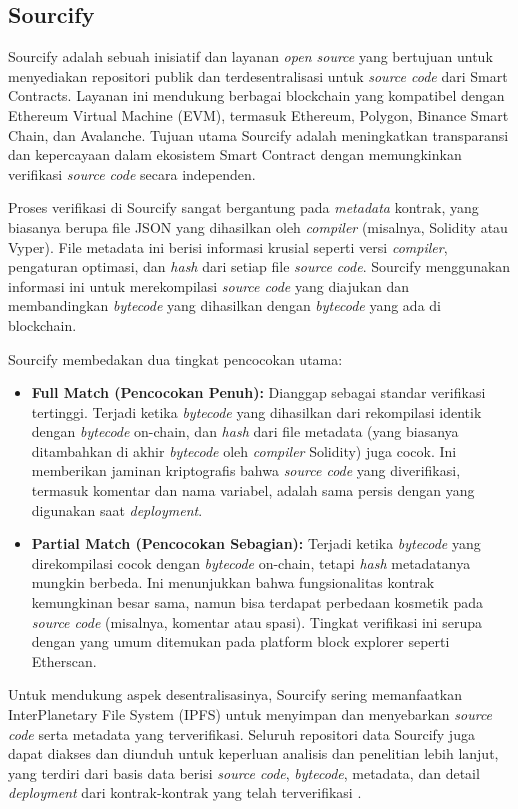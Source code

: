 \subsection{Sourcify}
\label{subsec:sourcify}

Sourcify adalah sebuah inisiatif dan layanan \textit{open source} yang bertujuan untuk menyediakan repositori publik dan terdesentralisasi untuk \textit{source code} dari Smart Contracts. Layanan ini mendukung berbagai blockchain yang kompatibel dengan Ethereum Virtual Machine (EVM), termasuk Ethereum, Polygon, Binance Smart Chain, dan Avalanche. Tujuan utama Sourcify adalah meningkatkan transparansi dan kepercayaan dalam ekosistem Smart Contract dengan memungkinkan verifikasi \textit{source code} secara independen.

Proses verifikasi di Sourcify sangat bergantung pada \textit{metadata} kontrak, yang biasanya berupa file JSON yang dihasilkan oleh \textit{compiler} (misalnya, Solidity atau Vyper). File metadata ini berisi informasi krusial seperti versi \textit{compiler}, pengaturan optimasi, dan \textit{hash} dari setiap file \textit{source code}. Sourcify menggunakan informasi ini untuk merekompilasi \textit{source code} yang diajukan dan membandingkan \textit{bytecode} yang dihasilkan dengan \textit{bytecode} yang ada di blockchain.

Sourcify membedakan dua tingkat pencocokan utama:
\begin{itemize}
	\item \textbf{Full Match (Pencocokan Penuh):} Dianggap sebagai standar verifikasi tertinggi. Terjadi ketika \textit{bytecode} yang dihasilkan dari rekompilasi identik dengan \textit{bytecode} on-chain, dan \textit{hash} dari file metadata (yang biasanya ditambahkan di akhir \textit{bytecode} oleh \textit{compiler} Solidity) juga cocok. Ini memberikan jaminan kriptografis bahwa \textit{source code} yang diverifikasi, termasuk komentar dan nama variabel, adalah sama persis dengan yang digunakan saat \textit{deployment}.
	\item \textbf{Partial Match (Pencocokan Sebagian):} Terjadi ketika \textit{bytecode} yang direkompilasi cocok dengan \textit{bytecode} on-chain, tetapi \textit{hash} metadatanya mungkin berbeda. Ini menunjukkan bahwa fungsionalitas kontrak kemungkinan besar sama, namun bisa terdapat perbedaan kosmetik pada \textit{source code} (misalnya, komentar atau spasi). Tingkat verifikasi ini serupa dengan yang umum ditemukan pada platform block explorer seperti Etherscan.
\end{itemize}

Untuk mendukung aspek desentralisasinya, Sourcify sering memanfaatkan InterPlanetary File System (IPFS) untuk menyimpan dan menyebarkan \textit{source code} serta metadata yang terverifikasi. Seluruh repositori data Sourcify juga dapat diakses dan diunduh untuk keperluan analisis dan penelitian lebih lanjut, yang terdiri dari basis data berisi \textit{source code}, \textit{bytecode}, metadata, dan detail \textit{deployment} dari kontrak-kontrak yang telah terverifikasi \parencite{sourcify_website}.